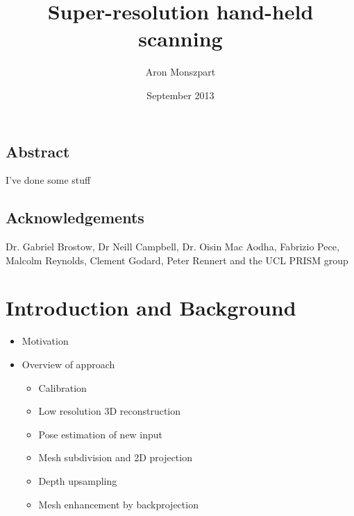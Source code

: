 \documentclass{ucl_thesis}
\author{Aron Monszpart}
\title{Super-resolution hand-held scanning}
\date{September 2013}
\begin{document}

\maketitle
{}
\setcounter{page}{1}
\pagestyle{plain}



\newpage
\section*{Abstract}
I've done some stuff
%


\newpage
\section*{Acknowledgements}
Dr. Gabriel Brostow, Dr Neill Campbell, Dr. Oisin Mac Aodha, Fabrizio Pece, Malcolm Reynolds, Clement Godard, Peter Rennert and the UCL PRISM group

\tableofcontents
\listoffigures
\newpage

\setcounter{page}{1}
\pagestyle{plain}

\chapter{Introduction and Background} 
\label{chp:background}
	\begin{itemize}	
		\item Motivation
		\item Overview of approach
		\begin{itemize}
			\item Calibration
			\item Low resolution 3D reconstruction
			\item Pose estimation of new input
			\item Mesh subdivision and 2D projection
			\item Depth upsampling
			\item Mesh enhancement by backprojection
		\end{itemize}
	\end{itemize}
\end{document}

